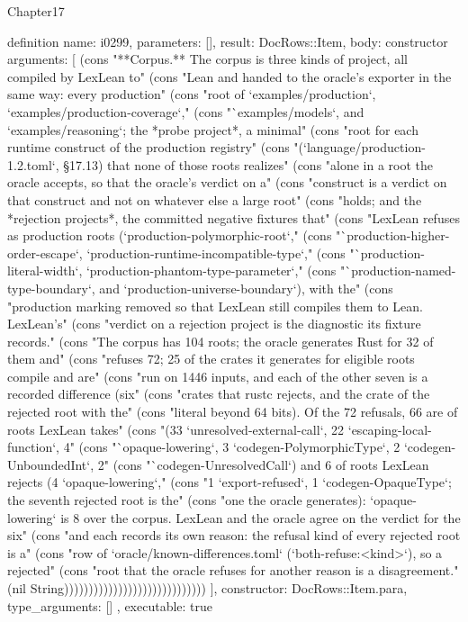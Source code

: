 \begin{lexlean}{Chapter17}
\begin{semanticmodule}
definition{
  name: i0299,
  parameters: [],
  result: DocRows::Item,
  body: constructor{
    arguments: [
      (cons "**Corpus.** The corpus is three kinds of project, all compiled by LexLean to" (cons "Lean and handed to the oracle's exporter in the same way: every production" (cons "root of `examples/production`, `examples/production-coverage`," (cons "`examples/models`, and `examples/reasoning`; the *probe project*, a minimal" (cons "root for each runtime construct of the production registry" (cons "(`language/production-1.2.toml`, §17.13) that none of those roots realizes" (cons "alone in a root the oracle accepts, so that the oracle's verdict on a" (cons "construct is a verdict on that construct and not on whatever else a large root" (cons "holds; and the *rejection projects*, the committed negative fixtures that" (cons "LexLean refuses as production roots (`production-polymorphic-root`," (cons "`production-higher-order-escape`, `production-runtime-incompatible-type`," (cons "`production-literal-width`, `production-phantom-type-parameter`," (cons "`production-named-type-boundary`, and `production-universe-boundary`), with the" (cons "production marking removed so that LexLean still compiles them to Lean. LexLean's" (cons "verdict on a rejection project is the diagnostic its fixture records." (cons "The corpus has 104 roots; the oracle generates Rust for 32 of them and" (cons "refuses 72; 25 of the crates it generates for eligible roots compile and are" (cons "run on 1446 inputs, and each of the other seven is a recorded difference (six" (cons "crates that rustc rejects, and the crate of the rejected root with the" (cons "literal beyond 64 bits). Of the 72 refusals, 66 are of roots LexLean takes" (cons "(33 `unresolved-external-call`, 22 `escaping-local-function`, 4" (cons "`opaque-lowering`, 3 `codegen-PolymorphicType`, 2 `codegen-UnboundedInt`, 2" (cons "`codegen-UnresolvedCall`) and 6 of roots LexLean rejects (4 `opaque-lowering`," (cons "1 `export-refused`, 1 `codegen-OpaqueType`; the seventh rejected root is the" (cons "one the oracle generates): `opaque-lowering` is 8 over the corpus. LexLean and the oracle agree on the verdict for the six" (cons "and each records its own reason: the refusal kind of every rejected root is a" (cons "row of `oracle/known-differences.toml` (`both-refuse:<kind>`), so a rejected" (cons "root that the oracle refuses for another reason is a disagreement." (nil String)))))))))))))))))))))))))))))
    ],
    constructor: DocRows::Item.para,
    type_arguments: []
  },
  executable: true
}


\end{semanticmodule}
\end{lexlean}
